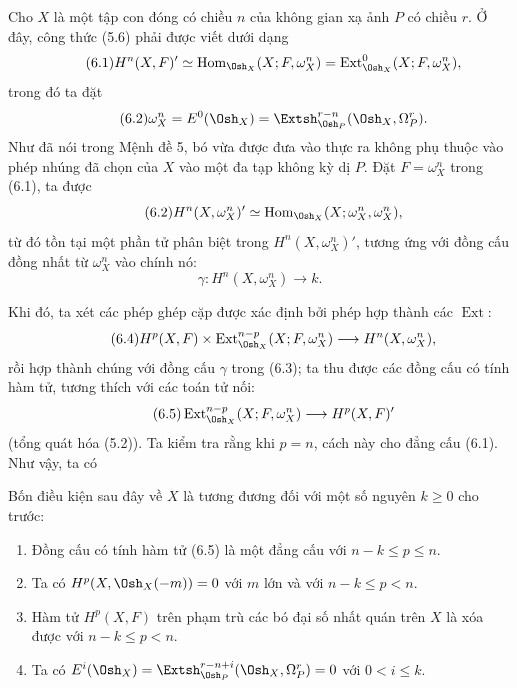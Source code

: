 Cho $X$ là một tập con đóng có chiều $n$ của không gian xạ ảnh $P$ có
chiều $r$. Ở đây, công thức (5.6) phải được viết dưới dạng
\begin{equation}\tag{6.1}
  H^{n}(X,F)'
  \simeq\operatorname{Hom}_{\Osh_X}(X;F,\omega_X^{n})
  =\operatorname{Ext}_{\Osh_X}^{0}(X;F,\omega_X^{n}),
\end{equation}
trong đó ta đặt
\begin{equation}\tag{6.2}
  \omega_X^{n}=E^{0}(\Osh_X)
  =\Extsh_{\Osh_P}^{r-n}(\Osh_X,\Omega_P^{r}).
\end{equation}
Như đã nói trong Mệnh đề 5, bó vừa được đưa vào thực ra không phụ thuộc
vào phép nhúng đã chọn của $X$ vào một đa tạp không kỳ dị $P$.
Đặt $F=\omega_X^{n}$ trong (6.1), ta được
\begin{equation}\tag{6.2}
  H^{n}(X,\omega_X^{n})'
  \simeq\operatorname{Hom}_{\Osh_X}(X;\omega_X^{n},\omega_X^{n}),
\end{equation}
 từ đó tồn tại một phần tử
phân biệt trong $H^{n}(X,\omega_X^{n})'$, tương ứng với đồng cấu
đồng nhất từ $\omega_X^{n}$ vào chính nó:
\begin{equation}\tag{6.3}
  \gamma:H^{n}(X,\omega_X^{n})\longrightarrow k.
\end{equation}

Khi đó, ta xét các phép ghép cặp được xác định bởi phép hợp thành các
$\operatorname{Ext}$:
\begin{equation}\tag{6.4}
  H^{p}(X,F)\times
  \operatorname{Ext}_{\Osh_X}^{n-p}(X;F,\omega_X^{n})
  \longrightarrow H^{n}(X,\omega_X^{n}),
\end{equation}
rồi hợp thành chúng với đồng cấu $\gamma$ trong (6.3); ta thu được
các đồng cấu có tính hàm tử, tương thích với các toán tử nối:
\begin{equation}\tag{6.5}
  \operatorname{Ext}_{\Osh_X}^{n-p}(X;F,\omega_X^{n})
  \longrightarrow H^{p}(X,F)'
\end{equation}
(tổng quát hóa (5.2)). Ta kiểm tra rằng khi $p=n$, cách này cho
đẳng cấu (6.1). Như vậy, ta có

 Bốn điều kiện sau đây về $X$ là tương đương đối với
một số nguyên $k\geq0$ cho trước:
\begin{enumerate}
  \item[\textit{i.}] Đồng cấu có tính hàm tử (6.5) là một đẳng cấu với
    $n-k\leq p\leq n$.
  \item[\textit{ii.}] Ta có $H^{p}(X,\Osh_X(-m))=0$ với $m$ lớn và với
    $n-k\leq p<n$.
  \item[\textit{iii.}] Hàm tử $H^{p}(X,F)$ trên phạm trù các bó đại số
    nhất quán trên $X$ là xóa được với $n-k\leq p<n$.
  \item[\textit{iv.}] Ta có
    $E^{i}(\Osh_X)=\Extsh_{\Osh_P}^{r-n+i}(\Osh_X,\Omega_P^{r})=0$
    với $0<i\leq k$.
\end{enumerate}

